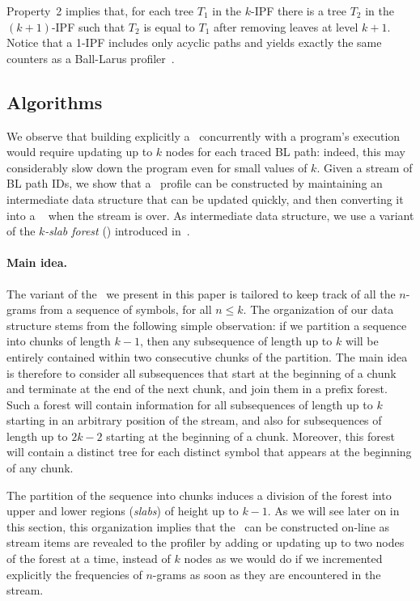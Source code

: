 Property~2 implies that, for each tree $T_1$ in the $k$-IPF there is a tree $T_2$ in the $(k+1)$-IPF such that $T_2$ is equal to $T_1$ after removing leaves at level $k+1$.
Notice that a 1-IPF includes only acyclic paths and yields exactly the same counters as a Ball-Larus profiler~\cite{Ball96}.


\subsection{Algorithms}

We observe that building explicitly a \kipf\ concurrently with a program's execution would require updating up to $k$ nodes for each traced BL path: indeed, this may considerably slow down the program even for small values of $k$. Given a stream of BL path IDs, we show that a \kipf\ profile can be constructed by maintaining an intermediate data structure that can be updated quickly, and then converting it into a \kipf\
when the stream is over. As intermediate data structure, we use a variant of the {\em $k$-slab forest} (\ksf) introduced in~\cite{Ausiello12}.

\paragraph*{Main idea.} The variant of the \ksf\ we present in this paper is tailored to keep track of all the $n$-grams from a sequence of symbols, for all $n\le k$. The organization of our data structure stems from the following simple observation: if we partition a sequence into chunks of length $k-1$, then any subsequence of length up to $k$ will be entirely contained within two consecutive chunks of the partition. The main idea is therefore to consider all subsequences that start at the beginning of a chunk and terminate at the end of the next chunk, and join them in a prefix forest. Such a forest will contain information for all subsequences of length up to $k$ starting in an arbitrary position of the stream, and also for subsequences of length up to $2k-2$ starting at the beginning of a chunk. Moreover, this forest will contain a distinct tree for each distinct symbol that appears at the beginning of any chunk.

The partition of the sequence into chunks induces a division of the forest into upper and lower regions ({\em slabs}) of height up to $k-1$. As we will see later on in this section, this organization implies that the \ksf\ can be constructed on-line as stream items are revealed to the profiler by adding or updating up to two nodes of the forest at a time, instead of $k$ nodes as we would do if we incremented explicitly the frequencies of $n$-grams as soon as they are encountered in the stream.


